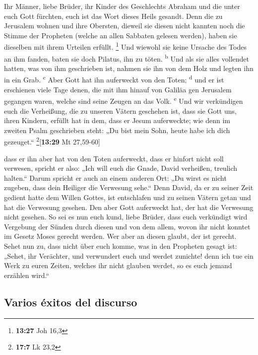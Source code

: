  Ihr Männer, liebe Brüder, ihr Kinder des Geschlechts
Abraham und die unter euch Gott fürchten, euch ist das Wort dieses Heils
gesandt.  Denn die zu Jerusalem wohnen und ihre Obersten,
dieweil sie diesen nicht kannten noch die Stimme der Propheten (welche
an allen Sabbaten gelesen werden), haben sie dieselben mit ihrem
Urteilen erfüllt. \footnote{\textbf{13:27} Joh 16,3}  Und
wiewohl sie keine Ursache des Todes an ihm fanden, baten sie doch
Pilatus, ihn zu töten. \textsuperscript{b}  Und als sie
alles vollendet hatten, was von ihm geschrieben ist, nahmen sie ihn von
dem Holz und legten ihn in ein Grab. \textsuperscript{c} 
Aber Gott hat ihn auferweckt von den Toten; \textsuperscript{d}
 und er ist erschienen viele Tage denen, die mit ihm
hinauf von Galiläa gen Jerusalem gegangen waren, welche sind seine
Zeugen an das Volk. \textsuperscript{e}  Und wir
verkündigen euch die Verheißung, die zu unseren Vätern geschehen ist,
 dass sie Gott uns, ihren Kindern, erfüllt hat in dem,
dass er Jesum auferweckte; wie denn im zweiten Psalm geschrieben steht:
„Du bist mein Sohn, heute habe ich dich gezeuget.``
\footnote{\textbf{17:7} Lk 23,2}{[}\textbf{13:29} Mt 27,59-60{]}

 dass er ihn aber hat von den Toten auferweckt, dass er
hinfort nicht soll verwesen, spricht er also: „Ich will euch die Gnade,
David verheißen, treulich halten.``  Darum spricht er
auch an einem anderen Ort: „Du wirst es nicht zugeben, dass dein
Heiliger die Verwesung sehe.``  Denn David, da er zu
seiner Zeit gedient hatte dem Willen Gottes, ist entschlafen und zu
seinen Vätern getan und hat die Verwesung gesehen.  Den
aber Gott auferweckt hat, der hat die Verwesung nicht gesehen.
 So sei es nun euch kund, liebe Brüder, dass euch
verkündigt wird Vergebung der Sünden durch diesen und von dem allem,
wovon ihr nicht konntet im Gesetz Moses gerecht werden. 
Wer aber an diesen glaubt, der ist gerecht.  Sehet nun
zu, dass nicht über euch komme, was in den Propheten gesagt ist:
 „Sehet, ihr Verächter, und verwundert euch und werdet
zunichte! denn ich tue ein Werk zu euren Zeiten, welches ihr nicht
glauben werdet, so es euch jemand erzählen wird.``

\hypertarget{varios-uxe9xitos-del-discurso}{%
\subsection{Varios éxitos del
discurso}\label{varios-uxe9xitos-del-discurso}}

